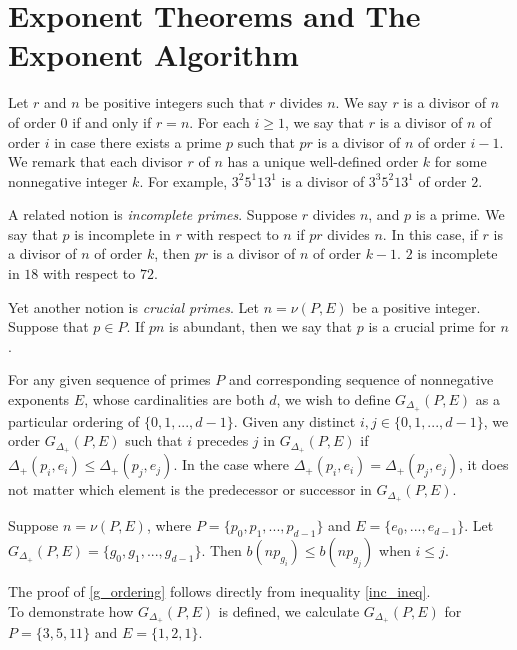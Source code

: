 \documentclass[../paper.tex]{subfiles}
\begin{document}
\section{Exponent Theorems and The Exponent Algorithm}

Let $r$ and $n$ be positive integers such that $r$ divides $n$. We
say $r$ is a divisor of $n$ of order $0$ if and only if $r = n$.
For each $i \geq 1$, we say that $r$ is a divisor of $n$ of order
$i$ in case there exists a prime $p$ such that $pr$ is a divisor
of $n$ of order $i - 1$. We remark that each divisor $r$ of $n$ has a 
unique well-defined order $k$ for some nonnegative integer $k$. For example, 
$3^2 5^1 13^1$ is a divisor of $3^3 5^2 13^1$ of order $2$. 

A related notion is \textit{incomplete primes}. Suppose $r$ divides 
$n$, and $p$ is a prime. We say that $p$ is incomplete in $r$ with 
respect to $n$ if $pr$ divides $n$. In this case, if $r$ is a divisor 
of $n$ of order $k$, then $pr$ is a divisor of $n$ of order $k - 1$.
$2$ is incomplete in $18$ with respect to $72$.

Yet another notion is \textit{crucial primes}. Let $n = \nu (P,E)$ 
be a positive integer. Suppose that $p \in P$. If $pn$ is
abundant, then we say that $p$ is a crucial prime for $n$. 

For any given sequence of primes $P$ and corresponding sequence of
nonnegative exponents $E$, whose cardinalities are both $d$, we
wish to define $G_{\Delta_+}(P,E)$ as a particular ordering of
$\{0, 1, ..., d-1\}$. Given any distinct $i,j \in \{0, 1, ..., 
d - 1\}$, we order $G_{\Delta_+}(P, E)$ such that $i$ precedes 
$j$ in $G_{\Delta_+}(P, E)$ if $\Delta_+(p_i, e_i) \leq 
\Delta_+(p_j, e_j)$. In the case where  $\Delta_+(p_i, e_i) =
\Delta_+(p_j, e_j)$, it does not matter which element is the
predecessor or successor in $G_{\Delta_+}(P,E)$.

\begin{theorem}\label{g_ordering}
Suppose $n = \nu(P, E)$, where $P = \{p_0, p_1, ..., p_{d-1}\}$
and $E = \{e_0, ..., e_{d-1}\}$. Let $G_{\Delta_+}(P,E) = \{g_0, 
g_1, ..., g_{d-1}\}$. Then $b(n p_{g_i}) \leq b(n p_{g_j})$ when $i \leq j$.
\end{theorem}

The proof of {\ref{g_ordering}} follows directly from inequality
\ref{inc_ineq}.
\\
To demonstrate how $G_{\Delta_+}(P,E)$ is defined, we calculate
$G_{\Delta_+}(P,E)$ for $P = \{3, 5, 11\}$ and $E = \{1, 2, 1\}$.
\end{document}
